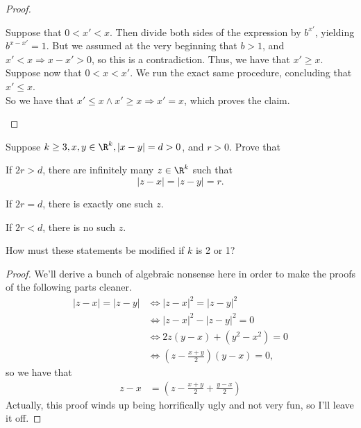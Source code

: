 \documentclass{assignment}
\begin{document}
\begin{proof}
\begin{qparts}
    Suppose that $0 < x' < x$. Then divide both sides of the expression by $b^{x'}$, yielding $b^{x - 
    x'} = 1$. But we assumed at the very beginning that $b > 1$, and $x' < x \Rightarrow x - x' > 0$, 
    so this is a contradiction. Thus, we have that $x' \geq x$. \\

    Suppose now that $0 < x < x'$. We run the exact same procedure, concluding that $x' \leq x$. \\

    So we have that $x'\leq x \wedge x'\geq x \Rightarrow x' = x$, which proves the claim.

  \end{qparts}
\end{proof}

\begin{question}[16]
  Suppose $k\geq 3, x,y\in\R^k, |x - y| = d > 0$, and $r > 0$. Prove that 
  \begin{qparts}
    \item If $2r > d$, there are infinitely many $z\in\R^k$ such that $$|z-x| = |z - y| = r.$$
    \item If $2r = d$, there is exactly one such $z$.
    \item If $2r < d$, there is no such $z$.
  \end{qparts}
  How must these statements be modified if $k$ is 2 or 1?
\end{question}
\begin{proof}
  We'll derive a bunch of algebraic nonsense here in order to make the proofs of the following parts
  cleaner.
    \begin{align*}
      |z - x| = |z - y| &\iff {|z-x|}^2 = {|z-y|}^2 \\
                        &\iff {|z-x|}^2 - {|z-y|}^2 = 0 \\
                        &\iff 2z(y - x) + (y^2 - x^2) = 0 \\
                        &\iff \left(z - \frac{x + y}{2}\right)(y - x) = 0,
    \end{align*}
    so we have that 
    \begin{align*}
      z -x &= \left(z - \frac{x + y}{2} + \frac{y - x}{2}\right)
    \end{align*}
    Actually, this proof winds up being horrifically ugly and not very fun, so I'll leave it off.
\end{proof}
\end{document}
